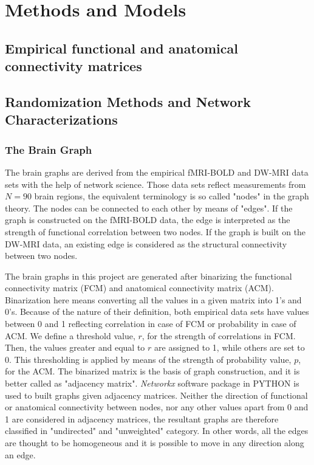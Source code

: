 
\chapter{Methods and Models} %

\label{Chapter2} %



\section{Empirical functional and anatomical connectivity matrices}

\section{Randomization Methods and Network Characterizations}

\subsection{The Brain Graph}

The brain graphs are derived from the empirical fMRI-BOLD and DW-MRI data sets with the help of network science. Those data sets reflect measurements from $N=90$ brain regions, the equivalent terminology is so called "nodes" in the graph theory. The nodes can be connected to each other by means of "edges". If the graph is constructed on the fMRI-BOLD data, the edge is interpreted as the strength of functional correlation between two nodes. If the graph is built on the DW-MRI data, an existing edge is considered as the structural connectivity between two nodes. 

The brain graphs in this project are generated after binarizing the functional connectivity matrix (FCM) and anatomical connectivity matrix (ACM). Binarization here means converting all the values in a given matrix into 1's and 0's. Because of the nature of their definition, both empirical data sets have values between 0 and 1 reflecting correlation in case of FCM or probability in case of ACM. We define a threshold value, $r$, for the strength of correlations in FCM. Then, the values greater and equal to $r$ are assigned to 1, while others are set to 0. This thresholding is applied by means of the strength of probability value, $p$, for the ACM. The binarized matrix is the basis of graph construction, and it is better called as "adjacency matrix". \textit{Networkx} software package in PYTHON is used to built graphs given adjacency matrices. Neither the direction of functional or anatomical connectivity between nodes, nor any other values apart from 0 and 1  are considered in adjacency matrices, the resultant graphs are therefore classified in "undirected" and "unweighted" category. In other words, all the edges are thought to be homogeneous and it is possible to move in any direction along an edge. 

